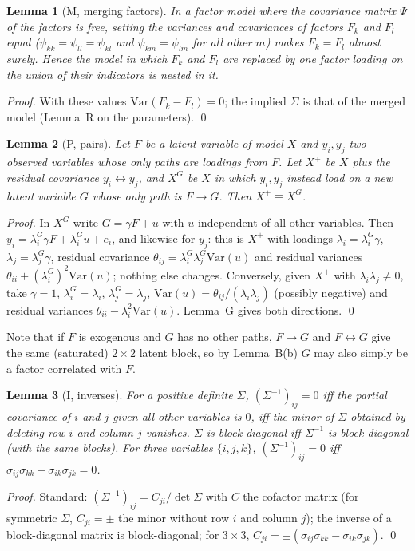 \documentclass[10pt,a4paper]{article}
\newtheorem*{lemma}{Lemma}
\begin{document}
\begin{lemma}[M, merging factors]
In a factor model where the covariance matrix $\Psi$ of the factors is free, setting the variances and covariances of factors $F_k$ and $F_l$ equal ($\psi_{kk}=\psi_{ll}=\psi_{kl}$ and $\psi_{km}=\psi_{lm}$ for all other $m$) makes $F_k=F_l$ almost surely. Hence the model in which $F_k$ and $F_l$ are replaced by one factor loading on the union of their indicators is nested in it.
\end{lemma}
\emph{Proof.} With these values $\mathrm{Var}(F_k-F_l)=0$; the implied $\Sigma$ is that of the merged model (Lemma~R on the parameters). \qed

\begin{lemma}[P, pairs]
Let $F$ be a latent variable of model $X$ and $y_i,y_j$ two observed variables whose only paths are loadings from $F$. Let $X^{+}$ be $X$ plus the residual covariance $y_i\leftrightarrow y_j$, and $X^{G}$ be $X$ in which $y_i,y_j$ instead load on a new latent variable $G$ whose only path is $F\to G$. Then $X^{+}\equiv X^{G}$.
\end{lemma}
\emph{Proof.} In $X^G$ write $G=\gamma F+u$ with $u$ independent of all other variables. Then $y_i=\lambda^G_i\gamma F+\lambda^G_iu+e_i$, and likewise for $y_j$: this is $X^{+}$ with loadings $\lambda_i=\lambda^G_i\gamma$, $\lambda_j=\lambda^G_j\gamma$, residual covariance $\theta_{ij}=\lambda^G_i\lambda^G_j\mathrm{Var}(u)$ and residual variances $\theta_{ii}+(\lambda^G_i)^2\mathrm{Var}(u)$; nothing else changes. Conversely, given $X^{+}$ with $\lambda_i\lambda_j\neq0$, take $\gamma=1$, $\lambda^G_i=\lambda_i$, $\lambda^G_j=\lambda_j$, $\mathrm{Var}(u)=\theta_{ij}/(\lambda_i\lambda_j)$ (possibly negative) and residual variances $\theta_{ii}-\lambda_i^2\mathrm{Var}(u)$. Lemma~G gives both directions. \qed

Note that if $F$ is exogenous and $G$ has no other paths, $F\to G$ and $F\leftrightarrow G$ give the same (saturated) $2\times2$ latent block, so by Lemma~B(b) $G$ may also simply be a factor correlated with $F$.

\begin{lemma}[I, inverses]
For a positive definite $\Sigma$, $(\Sigma^{-1})_{ij}=0$ iff the partial covariance of $i$ and $j$ given all other variables is $0$, iff the minor of $\Sigma$ obtained by deleting row $i$ and column $j$ vanishes. $\Sigma$ is block-diagonal iff $\Sigma^{-1}$ is block-diagonal (with the same blocks). For three variables $\{i,j,k\}$, $(\Sigma^{-1})_{ij}=0$ iff $\sigma_{ij}\sigma_{kk}-\sigma_{ik}\sigma_{jk}=0$.
\end{lemma}
\emph{Proof.} Standard: $(\Sigma^{-1})_{ij}=C_{ji}/\det\Sigma$ with $C$ the cofactor matrix (for symmetric $\Sigma$, $C_{ji}=\pm$ the minor without row $i$ and column $j$); the inverse of a block-diagonal matrix is block-diagonal; for $3\times3$, $C_{ji}=\pm(\sigma_{ij}\sigma_{kk}-\sigma_{ik}\sigma_{jk})$. \qed
\end{document}
